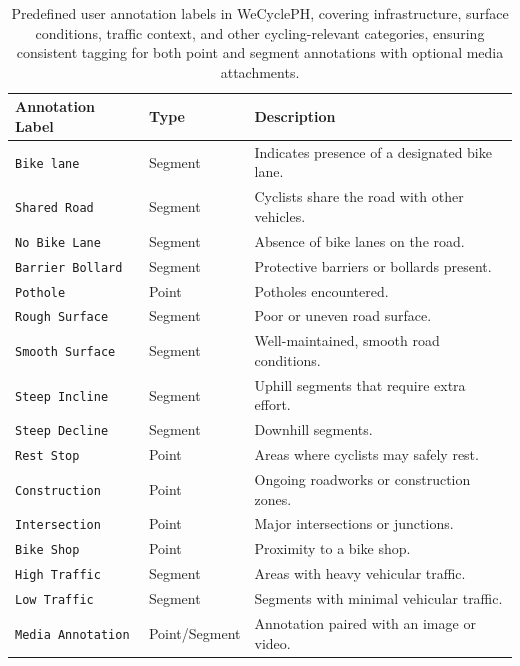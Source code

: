 \begin{table}[H]
\centering
\begin{tabular}{|p{4.5cm}|p{2.5cm}|p{6.5cm}|}
\hline
\textbf{Annotation Label} & \textbf{Type} & \textbf{Description} \\
\hline
\texttt{Bike lane} & Segment & Indicates presence of a designated bike lane. \\
\hline
\texttt{Shared Road} & Segment & Cyclists share the road with other vehicles. \\
\hline
\texttt{No Bike Lane} & Segment & Absence of bike lanes on the road. \\
\hline
\texttt{Barrier Bollard} & Segment & Protective barriers or bollards present. \\
\hline
\texttt{Pothole} & Point & Potholes encountered. \\
\hline
\texttt{Rough Surface} & Segment & Poor or uneven road surface. \\
\hline
\texttt{Smooth Surface} & Segment & Well-maintained, smooth road conditions. \\
\hline
\texttt{Steep Incline} & Segment & Uphill segments that require extra effort. \\
\hline
\texttt{Steep Decline} & Segment & Downhill segments. \\
\hline
\texttt{Rest Stop} & Point & Areas where cyclists may safely rest. \\
\hline
\texttt{Construction} & Point & Ongoing roadworks or construction zones. \\
\hline
\texttt{Intersection} & Point & Major intersections or junctions. \\
\hline
\texttt{Bike Shop} & Point & Proximity to a bike shop. \\
\hline
\texttt{High Traffic} & Segment & Areas with heavy vehicular traffic. \\
\hline
\texttt{Low Traffic} & Segment & Segments with minimal vehicular traffic. \\
\hline
\texttt{Media Annotation} & Point/Segment & Annotation paired with an image or video. \\
\hline
\end{tabular}
\caption{Predefined user annotation labels in WeCyclePH, covering infrastructure, surface conditions, traffic context, and other cycling-relevant categories, ensuring consistent tagging for both point and segment annotations with optional media attachments.}
\label{tab:annotation_mapping}
\end{table}

